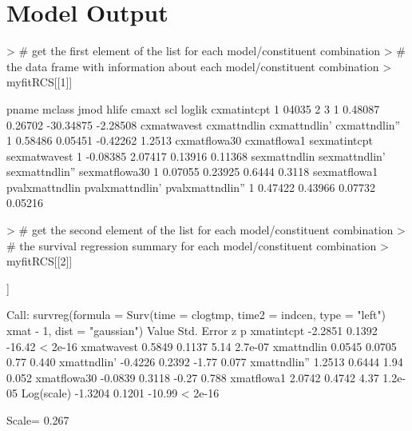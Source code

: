 \documentclass[11pt]{article}
\begin{document}
\section{Model Output}

\begin{Schunk}
\begin{Sinput}
> # get the first element of the list for each model/constituent combination
> # the data frame with information about each model/constituent combination
> myfitRCS[[1]]
\end{Sinput}
\begin{Soutput}
  pname mclass jmod hlife   cmaxt     scl    loglik cxmatintcpt
1 04035      2    3     1 0.48087 0.26702 -30.34875    -2.28508
  cxmatwavest cxmattndlin cxmattndlin' cxmattndlin''
1     0.58486     0.05451     -0.42262        1.2513
  cxmatflowa30 cxmatflowa1 sexmatintcpt sexmatwavest
1     -0.08385     2.07417      0.13916      0.11368
  sexmattndlin sexmattndlin' sexmattndlin'' sexmatflowa30
1      0.07055       0.23925         0.6444        0.3118
  sexmatflowa1 pvalxmattndlin pvalxmattndlin' pvalxmattndlin''
1      0.47422        0.43966         0.07732          0.05216
\end{Soutput}
\begin{Sinput}
> # get the second element of the list for each model/constituent combination
> # the survival regression summary for each model/constituent combination
> myfitRCS[[2]]
\end{Sinput}
\begin{Soutput}
[[1]]

Call:
survreg(formula = Surv(time = clogtmp, time2 = indcen, type = "left") ~ 
    xmat - 1, dist = "gaussian")
               Value Std. Error      z       p
xmatintcpt   -2.2851     0.1392 -16.42 < 2e-16
xmatwavest    0.5849     0.1137   5.14 2.7e-07
xmattndlin    0.0545     0.0705   0.77   0.440
xmattndlin'  -0.4226     0.2392  -1.77   0.077
xmattndlin''  1.2513     0.6444   1.94   0.052
xmatflowa30  -0.0839     0.3118  -0.27   0.788
xmatflowa1    2.0742     0.4742   4.37 1.2e-05
Log(scale)   -1.3204     0.1201 -10.99 < 2e-16

Scale= 0.267 


\end{Soutput}
\end{Schunk}
\end{document}
